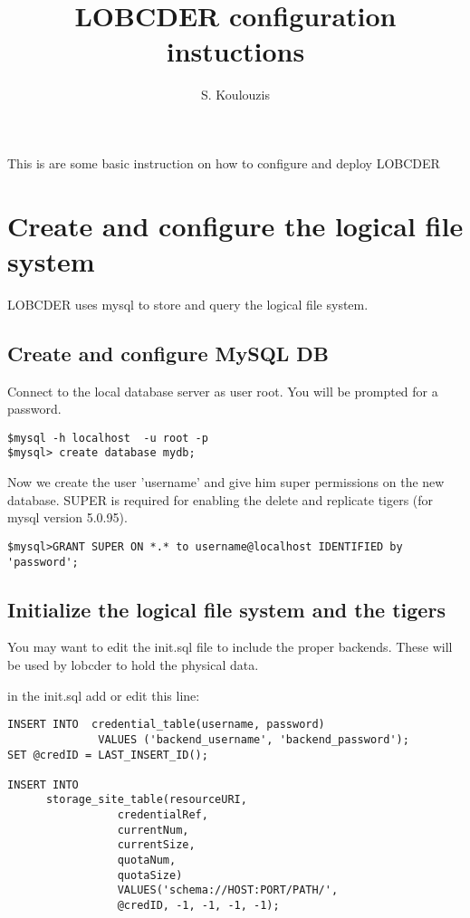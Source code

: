 \documentclass[a4paper,10pt]{article}
\title{LOBCDER configuration instuctions}
\author{S. Koulouzis}
\date{}
\begin{document}
\maketitle
This is are some basic instruction on how to configure and deploy LOBCDER 

\section{Create and configure the logical file system}
LOBCDER uses mysql to store and query the logical file system.

\subsection{Create and configure MySQL DB}
Connect to the local database server as user root. You will be prompted for a password.

\begin{lstlisting}
$mysql -h localhost  -u root -p
$mysql> create database mydb;
\end{lstlisting}


Now we create the user 'username' and give him super permissions on the new database. SUPER is required for enabling the delete and replicate tigers (for mysql version 5.0.95). 
\begin{lstlisting}
$mysql>GRANT SUPER ON *.* to username@localhost IDENTIFIED by 'password';
\end{lstlisting}


\subsection{Initialize the logical file system and the tigers}
You may want to edit the init.sql file to include the proper backends. These will be used by lobcder to hold the physical data.

in the init.sql add or edit this line: 

\begin{lstlisting}
INSERT INTO  credential_table(username, password) 
			  VALUES ('backend_username', 'backend_password');
SET @credID = LAST_INSERT_ID();

INSERT INTO 
	  storage_site_table(resourceURI, 
			     credentialRef, 
			     currentNum, 
			     currentSize, 
			     quotaNum, 
			     quotaSize)
			     VALUES('schema://HOST:PORT/PATH/', 
			     @credID, -1, -1, -1, -1);
\end{lstlisting}
\end{document}
